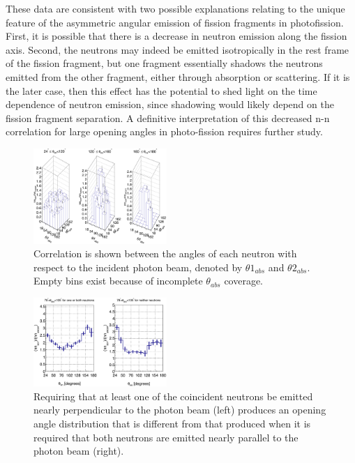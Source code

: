 \documentclass[%
 reprint,
 amsmath,amssymb,
 aps,
 nofootinbib
]{revtex4-1}
\begin{document}
These data are consistent with two possible explanations relating to the unique feature of the asymmetric angular emission of fission fragments in photofission.
First, it is possible that there is a decrease in neutron emission along the fission axis.
Second, the neutrons may indeed be emitted isotropically in the rest frame of the fission fragment, but one fragment essentially shadows the neutrons emitted from the other fragment, either through absorption or scattering.
If it is the later case, then this effect has the potential to shed light on the time dependence of neutron emission, since shadowing would likely depend on the fission fragment separation.
A definitive interpretation of this decreased n-n correlation for large opening angles in photo-fission requires further study.

\begin{figure}
    \includegraphics[width = 0.45\textwidth]{theta_abs_LEGO.png}
    \caption{Correlation is shown between the angles of each neutron with respect to the incident photon beam, denoted by $\theta 1_{abs}$ and $\theta 2_{abs}$.
    Empty bins exist because of incomplete $\theta_{abs}$ coverage.}
    \label{fig:theta_abs_LEGO}
\end{figure}

\begin{figure}
\includegraphics[width=0.45\textwidth]{theta_abs_two-neutron.png}
\caption{Requiring that at least one of the coincident neutrons be emitted nearly perpendicular to the photon beam (left) produces an opening angle distribution that is different from that produced when it is required that both neutrons are emitted nearly parallel to the photon beam (right).}
\label{fig:theta_abs_two_neutron}
\end{figure}
\end{document}
